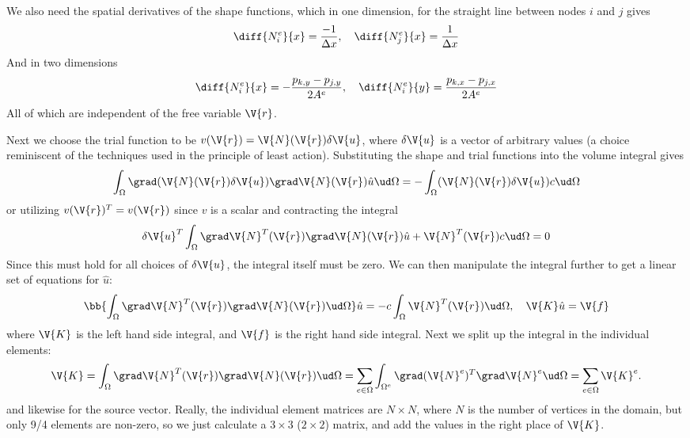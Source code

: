 \documentclass[sigconf]{acmart}
\begin{document}
We also need the spatial derivatives of the shape functions, which in one dimension, for the straight line between nodes $ i $ and $ j $ gives
\begin{equation}\label{key}
	\diff{N_i^e}{x} = \frac{-1}{\Delta x}, \quad \diff{N^e_j}{x} = \frac{1}{\Delta x}
\end{equation}
And in two dimensions
\begin{equation}\label{key}
	\diff{N_i^e}{x} = -\frac{p_{k,y} - p_{j,y}}{2A^e}, \quad \diff{N_i^e}{y} = \frac{p_{k,x} - p_{j,x}}{2 A^e}
\end{equation}
All of which are independent of the free variable $ \V{r} $.

Next we choose the trial function to be $ v(\V{r}) = \V{N}(\V{r}) \delta \V{u} $, where $ \delta \V{u} $ is a vector of arbitrary values (a choice reminiscent of the techniques used in the principle of least action). Substituting the shape and trial functions into the volume integral gives
\begin{equation}\label{key}
	\int_{\Omega} \grad (\V{N}(\V{r}) \delta \V{u}) \grad \V{N}(\V{r}) \hat{u} \ud \Omega =- \int_{\Omega} (\V{N}(\V{r})\delta \V{u}) c \ud \Omega
\end{equation}
or utilizing $ v(\V{r})^T = v(\V{r}) $ since $ v $ is a scalar and contracting the integral
\begin{equation}\label{key}
\delta \V{u}^T \int_{\Omega} \grad \V{N}^T(\V{r}) \grad \V{N}(\V{r}) \hat{u} + \V{N}^T(\V{r}) c \ud \Omega = 0 
\end{equation}
Since this must hold for all choices of $ \delta \V{u} $, the integral itself must be zero. We can then manipulate the integral further to get a linear set of equations for $ \hat{u} $:
\begin{equation}\label{key}
\bb{\int_{\Omega} \grad \V{N}^T(\V{r}) \grad \V{N}(\V{r}) \ud \Omega}  \hat{u} = -c \int_{\Omega} \V{N}^T(\V{r}) \ud \Omega, \quad \V{K}\hat{u} = \V{f}
\end{equation}
where $ \V{K} $ is the left hand side integral, and $ \V{f} $ is the right hand side integral. Next we split up the integral in the individual elements:
\begin{equation}\label{key}
	\V{K} = \int_{\Omega} \grad \V{N}^T(\V{r}) \grad \V{N}(\V{r}) \ud \Omega = \sum_{e\in \Omega} \int_{\Omega^e} \grad (\V{N}^e)^T \grad \V{N}^e \ud \Omega = \sum_{e\in \Omega} \V{K}^e.
\end{equation}
and likewise for the source vector. Really, the individual element matrices are $ N \times N $, where $ N $ is the number of vertices in the domain, but only 9/4 elements are non-zero, so we just calculate a $ 3\times 3 $ ($ 2\times 2 $) matrix, and add the values in the right place of $ \V{K} $.
\end{document}
